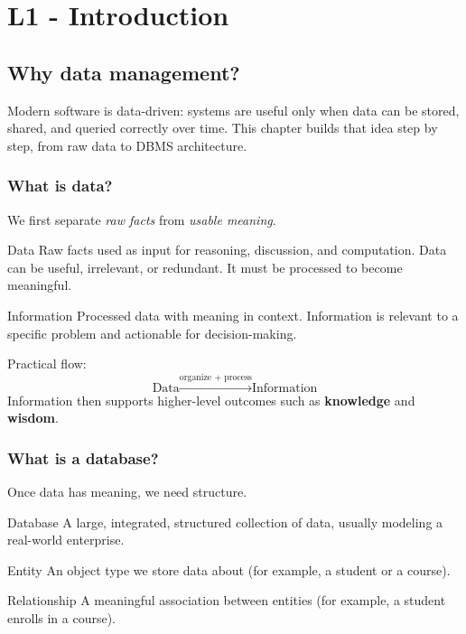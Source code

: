 \documentclass[../../dis.tex]{subfiles}
\begin{document}
\chapter{L1 - Introduction}\label{chap:l1}
\vfill
\section{Why data management?}
Modern software is data-driven: systems are useful only when data can be stored, shared, and queried correctly over time. This chapter builds that idea step by step, from raw data to DBMS architecture.

\subsection{What is data?}
We first separate \emph{raw facts} from \emph{usable meaning}.

\begin{concept}{Data}
Raw facts used as input for reasoning, discussion, and computation. Data can be useful, irrelevant, or redundant. It must be processed to become meaningful.
\end{concept}

\begin{concept}{Information}
Processed data with meaning in context. Information is relevant to a specific problem and actionable for decision-making.
\end{concept}

Practical flow:
\[
\text{Data} \xrightarrow{\text{organize + process}} \text{Information}
\]
Information then supports higher-level outcomes such as \textbf{knowledge} and \textbf{wisdom}.
\newpage
\subsection{What is a database?}
Once data has meaning, we need structure.

\begin{concept}{Database}
A large, integrated, structured collection of data, usually modeling a real-world enterprise.
\end{concept}

\begin{concept}{Entity}
An object type we store data about (for example, a student or a course).
\end{concept}

\begin{concept}{Relationship}
A meaningful association between entities (for example, a student enrolls in a course).
\end{concept}
\end{document}
